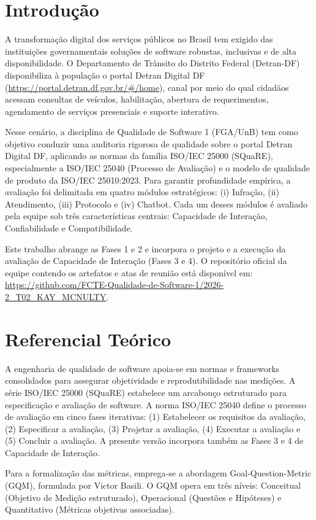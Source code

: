 \documentclass[12pt]{article}
\begin{document}
\section{Introdução}
A transformação digital dos serviços públicos no Brasil tem exigido das instituições governamentais soluções de software robustas, inclusivas e de alta disponibilidade. O Departamento de Trânsito do Distrito Federal (Detran-DF) disponibiliza à população o portal Detran Digital DF (\url{https://portal.detran.df.gov.br/#/home}), canal por meio do qual cidadãos acessam consultas de veículos, habilitação, abertura de requerimentos, agendamento de serviços presenciais e suporte interativo.

Nesse cenário, a disciplina de Qualidade de Software 1 (FGA/UnB) tem como objetivo conduzir uma auditoria rigorosa de qualidade sobre o portal Detran Digital DF, aplicando as normas da família ISO/IEC 25000 (SQuaRE), especialmente a ISO/IEC 25040 (Processo de Avaliação) e o modelo de qualidade de produto da ISO/IEC 25010:2023. Para garantir profundidade empírica, a avaliação foi delimitada em quatro módulos estratégicos: (i) Infração, (ii) Atendimento, (iii) Protocolo e (iv) Chatbot. Cada um desses módulos é avaliado pela equipe sob três características centrais: Capacidade de Interação, Confiabilidade e Compatibilidade.

Este trabalho abrange as Fases 1 e 2 e incorpora o projeto e a execução da avaliação de Capacidade de Interação (Fases 3 e 4). O repositório oficial da equipe contendo os artefatos e atas de reunião está disponível em: \url{https://github.com/FCTE-Qualidade-de-Software-1/2026-2_T02_KAY_MCNULTY}.

\section{Referencial Teórico}
A engenharia de qualidade de software apoia-se em normas e frameworks consolidados para assegurar objetividade e reprodutibilidade nas medições. A série ISO/IEC 25000 (SQuaRE) estabelece um arcabouço estruturado para especificação e avaliação de software. A norma ISO/IEC 25040 define o processo de avaliação em cinco fases iterativas: (1) Estabelecer os requisitos da avaliação, (2) Especificar a avaliação, (3) Projetar a avaliação, (4) Executar a avaliação e (5) Concluir a avaliação. A presente versão incorpora também as Fases 3 e 4 de Capacidade de Interação.

Para a formalização das métricas, emprega-se a abordagem Goal-Question-Metric (GQM), formulada por Victor Basili. O GQM opera em três níveis: Conceitual (Objetivo de Medição estruturado), Operacional (Questões e Hipóteses) e Quantitativo (Métricas objetivas associadas).
\end{document}
